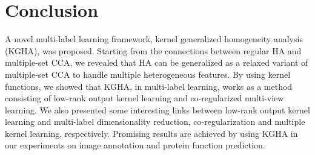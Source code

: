 \documentclass[a4paper]{article}
\begin{document}
\section{Conclusion}
A novel multi-label learning framework, kernel generalized homogeneity analysis (KGHA),  was proposed. Starting from the connections between regular HA and 
multiple-set CCA, we revealed that HA can be generalized as a relaxed variant of multiple-set CCA to handle multiple heterogeneous features. By using kernel 
functions, we showed that KGHA, in multi-label learning, works as a method consisting of  low-rank output kernel learning and co-regularized multi-view learning. 
We also presented some interesting links between low-rank output kernel learning and multi-label dimensionality reduction, co-regularization and multiple kernel learning, 
respectively. Promising results are achieved by using KGHA in our experiments on image annotation and protein function prediction.



\end{document}
